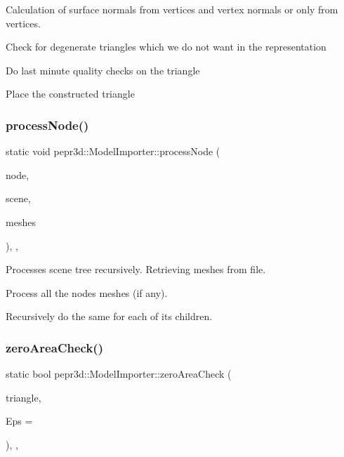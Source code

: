 Calculation of surface normals from vertices and vertex normals or only from vertices.

Check for degenerate triangles which we do not want in the representation

Do last minute quality checks on the triangle

Place the constructed triangle \mbox{\label{classpepr3d_1_1_model_importer_a4594f67b4aa8b90ac1a21e52e1871494}} 
\subsubsection{\texorpdfstring{processNode()}{processNode()}}
{\footnotesize\ttfamily static void pepr3d\+::\+Model\+Importer\+::process\+Node (\begin{DoxyParamCaption}\item[{ai\+Node $\ast$}]{node,  }\item[{const ai\+Scene $\ast$}]{scene,  }\item[{std\+::vector$<$ ai\+Mesh $\ast$ $>$ \&}]{meshes }\end{DoxyParamCaption})\hspace{0.3cm}{\ttfamily [inline]}, {\ttfamily [static]}, {\ttfamily [private]}}



Processes scene tree recursively. Retrieving meshes from file. 

Process all the node\textquotesingle{}s meshes (if any).

Recursively do the same for each of its children. \mbox{\label{classpepr3d_1_1_model_importer_a4d252ce45c2cf7a093d8b067b55ba2ca}} 
\subsubsection{\texorpdfstring{zeroAreaCheck()}{zeroAreaCheck()}}
{\footnotesize\ttfamily static bool pepr3d\+::\+Model\+Importer\+::zero\+Area\+Check (\begin{DoxyParamCaption}\item[{const std\+::array$<$ glm\+::vec3, 3 $>$ \&}]{triangle,  }\item[{const double}]{Eps = {} }\end{DoxyParamCaption})\hspace{0.3cm}{\ttfamily [inline]}, {\ttfamily [static]}, {\ttfamily [private]}}



